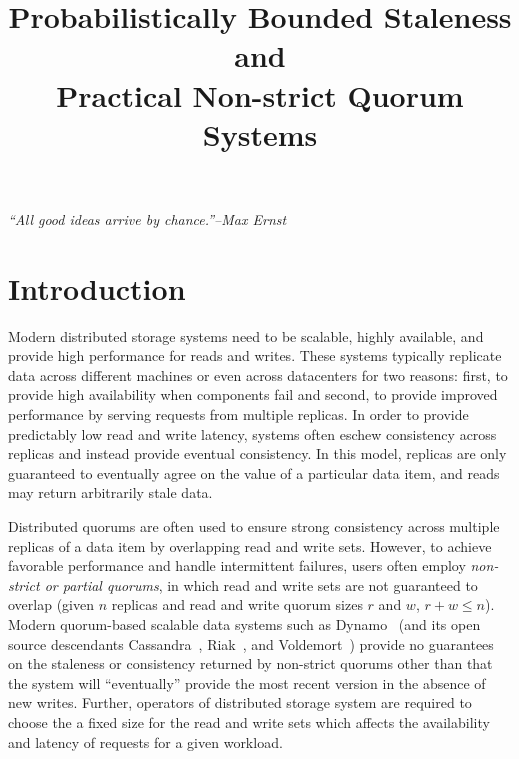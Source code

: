\documentclass{vldb}
\title{Probabilistically Bounded Staleness and\\ Practical Non-strict Quorum Systems}
\begin{document}

\maketitle

\noindent\textit{``All good ideas arrive by chance.''--Max Ernst}



\section{Introduction}

Modern distributed storage systems need to be scalable, highly
available, and provide high performance for reads and writes.  These
systems typically replicate data across different machines or even
across datacenters for two reasons: first, to provide high
availability when components fail and second, to provide improved
performance by serving requests from multiple replicas.  In order to
provide predictably low read and write latency, systems often eschew
consistency across replicas and instead provide eventual
consistency. In this model, replicas are only guaranteed to eventually
agree on the value of a particular data item, and reads may return
arbitrarily stale data.

Distributed quorums are often used to ensure strong consistency across
multiple replicas of a data item by overlapping read and write
sets. However, to achieve favorable performance and handle
intermittent failures, users often employ \textit{non-strict or
  partial quorums}, in which read and write sets are not guaranteed to
overlap (given $n$ replicas and read and write quorum sizes $r$ and
$w$, $r+w \leq n$).  Modern quorum-based scalable data systems such as
Dynamo~\cite{dynamo} (and its open source descendants
Cassandra~\cite{cassandra}, Riak~\cite{riak}, and
Voldemort~\cite{voldemort}) provide no guarantees on the staleness or
consistency returned by non-strict quorums other than that the system
will ``eventually'' provide the most recent version in the absence of new
writes. Further, operators of distributed storage system are required
to choose the a fixed size for the read and write sets which affects
the availability and latency of requests for a given workload.
\end{document}
